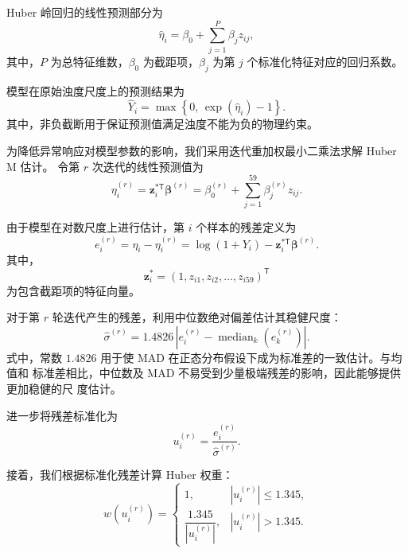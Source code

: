 \documentclass[UTF8,12pt,a4paper]{ctexart}
\begin{document}
Huber 岭回归的线性预测部分为
\begin{equation}
\widehat \eta_i
=
\beta_0+\sum_{j=1}^{P}\beta_jz_{ij},
\label{eq:huber-ridge-linear}
\end{equation}
其中，$P$ 为总特征维数，$\beta_0$ 为截距项，$\beta_j$ 为第 $j$ 个标准化特征对应的回归系数。

模型在原始浊度尺度上的预测结果为
\begin{equation}
\widehat Y_i
=
\max\left\{
0,\,
\exp(\widehat \eta_i)-1
\right\}.
\label{eq:huber-ridge-inverse}
\end{equation}
其中，非负截断用于保证预测值满足浊度不能为负的物理约束。

为降低异常响应对模型参数的影响，我们采用迭代重加权最小二乘法求解 Huber M 估计。
令第 $r$ 次迭代的线性预测值为
  \begin{equation}
  \eta_i^{(r)}
  =
  \boldsymbol z_i^{*\mathsf T}\boldsymbol\beta^{(r)}
  =
  \beta_0^{(r)}
  +\sum_{j=1}^{59}\beta_j^{(r)}z_{ij}.
  \end{equation}

由于模型在对数尺度上进行估计，第 $i$ 个样本的残差定义为
  \begin{equation}
  e_i^{(r)}
  =
  \eta_i-\eta_i^{(r)}
  =
  \log(1+Y_i)
  -\boldsymbol z_i^{*\mathsf T}\boldsymbol\beta^{(r)}.
  \label{eq:huber-residual}
  \end{equation}
其中，
\[
\boldsymbol z_i^*
=
(1,z_{i1},z_{i2},\ldots,z_{i59})^{\mathsf T}
\]
为包含截距项的特征向量。

对于第 $r$ 轮迭代产生的残差，利用中位数绝对偏差估计其稳健尺度：
\begin{equation}
\widehat{\sigma}^{(r)}
=
1.4826\,
\left|
e_i^{(r)}
-
\operatorname{median}_{k}\!\left(e_k^{(r)}\right)
\right|.
\label{eq:mad-scale}
\end{equation}
式中，常数 $1.4826$ 用于使 MAD 在正态分布假设下成为标准差的一致估计。与均值和
标准差相比，中位数及 MAD 不易受到少量极端残差的影响，因此能够提供更加稳健的尺
度估计。

进一步将残差标准化为
\begin{equation}
u_i^{(r)}
=
\frac{e_i^{(r)}}{\widehat{\sigma}^{(r)}}.
\label{eq:standardized-residual}
\end{equation}

接着，我们根据标准化残差计算 Huber 权重：
\begin{equation}
w\!\left(u_i^{(r)}\right)
=
\begin{cases}
1,
&\left|u_i^{(r)}\right|\leq 1.345,\\[2mm]
\dfrac{1.345}{\left|u_i^{(r)}\right|},
&\left|u_i^{(r)}\right|>1.345.
\end{cases}
\label{eq:huber}
\end{equation}
\end{document}
